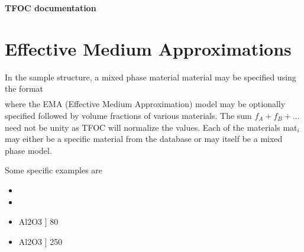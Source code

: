 \documentclass[10pt]{article}
\begin{document}
\begin{center}
{\bf TFOC documentation}
\end{center}

\section{Effective Medium Approximations}

In the sample structure, a mixed phase material material may be
specified using the format
\begin{eqnarray*}
 [ ~\lbrace\mbox{model}\rbrace~~f_1~~mat_A~~f_2~~mat_B~~\dots~]
\end{eqnarray*}
where the EMA (Effective Medium Approximation) model may be optionally specified
followed by volume fractions of various materials.  The sum $f_A+f_B+\dots$ need not be
unity as TFOC will normalize the values. Each of the materials mat$_i$ may either be
a specific material from the database or may itself be a mixed phase model.  

Some specific examples are
\begin{itemize}
\item{}
\item{}
\item\enskip [ 0.8 Si 0.1 [ 0.3 SiO2 0.7 Si3N4 ] 0.1 Al2O3 ] 80
\item\enskip [ LOOYENGA 0.8 Si 0.1 [ BRUGGEMAN 0.3 SiO2 0.7 Si3N4 ] 0.1 Al2O3 ] 250
\end{itemize}
\end{document}
